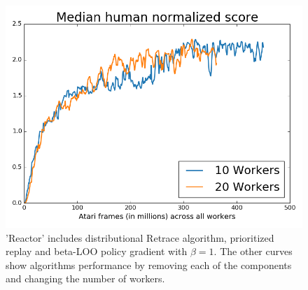 \documentclass{article}
\begin{document}
\begin{figure}
\begin{minipage}{.32\textwidth}
\end{minipage}
\begin{minipage}{.32\textwidth}
\vspace{0pt}
  \centering
  \includegraphics[width=1.0\textwidth]{scaling_median}
\end{minipage}
  \caption{
  \small 'Reactor' includes distributional Retrace 
     algorithm, prioritized replay and beta-LOO policy 
     gradient with $\beta=1$. The other curves show algorithms 
     performance by removing each of the components and changing the number of 
     workers.}
  \label{learningcurves}
\end{figure}
\fi
\end{document}
